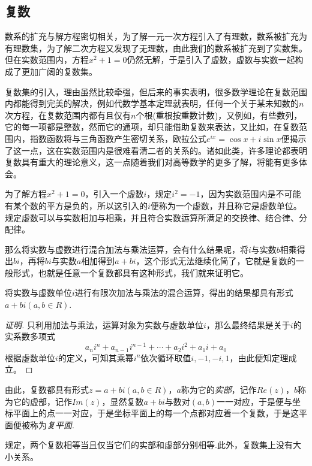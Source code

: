 \subsection{复数}
\label{sec:complex-number}

数系的扩充与解方程密切相关，为了解一元一次方程引入了有理数，数系被扩充为有理数集，为了解二次方程又发现了无理数，由此我们的数系被扩充到了实数集。但在实数范围内，方程$x^2+1=0$仍然无解，于是引入了虚数，虚数与实数一起构成了更加广阔的复数集。

复数集的引入，理由虽然比较牵强，但后来的事实表明，很多数学理论在复数范围内都能得到完美的解决，例如代数学基本定理就表明，任何一个关于某未知数的$n$次方程，在复数范围内都有且仅有$n$个根(重根按重数计数)，又例如，有些数列，它的每一项都是整数，然而它的通项，却只能借助复数来表达，又比如，在复数范围内，指数函数将与三角函数产生密切关系，欧拉公式$e^{ix}=\cos{x}+i\sin{x}$便揭示了这一点，这在实数范围内是很难看清二者的关系的。诸如此类，许多理论都表明复数具有重大的理论意义，这一点随着我们对高等数学的更多了解，将能有更多体会。

为了解方程$x^2+1=0$，引入一个虚数$i$，规定$i^2=-1$，因为实数范围内是不可能有某个数的平方是负的，所以这引入的$i$便称为一个虚数，并且称它是虚数单位。规定虚数可以与实数相加与相乘，并且符合实数运算所满足的交换律、结合律、分配律。

那么将实数与虚数进行混合加法与乘法运算，会有什么结果呢，将$i$与实数$b$相乘得出$bi$，再将$bi$与实数$a$相加得到$a+bi$，这个形式无法继续化简了，它就是复数的一般形式，也就是任意一个复数都具有这种形式，我们就来证明它。

\begin{theorem}
  将实数与虚数单位$i$进行有限次加法与乘法的混合运算，得出的结果都具有形式$a+bi(a,b\in R)$.
\end{theorem}

\begin{proof}[证明]
  只利用加法与乘法，运算对象为实数与虚数单位$i$，那么最终结果是关于$i$的实系数多项式
  \[ a_ni^n+a_{n-1}i^{n-1} + \cdots + a_2i^2 + a_1i+a_0 \]
  根据虚数单位$i$的定义，可知其乘幂$i^n$依次循环取值$i,-1,-i,1$，由此便知定理成立。
\end{proof}

由此，复数都具有形式$z=a+bi(a,b\in R)$，$a$称为它的\emph{实部}，记作$Re(z)$，$b$称为它的虚部，记作$Im(z)$，显然复数$a+bi$与数对$(a,b)$一一对应，于是便与坐标平面上的点一一对应，于是坐标平面上的每一个点都对应着一个复数，于是这平面便被称为\emph{复平面}.

规定，两个复数相等当且仅当它们的实部和虚部分别相等.此外，复数集上没有大小关系。

